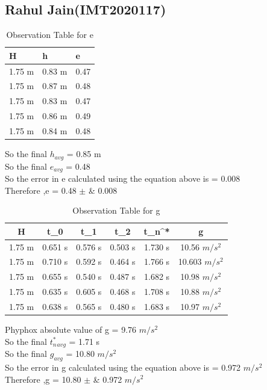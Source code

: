 \documentclass[11pt]{scrartcl} %
\begin{document}
\subsection{Rahul Jain(IMT2020117)}

\begin{table}[h] %
	\centering %
	\begin{tabular}{l l l}
		\toprule
		\textbf{H} & \textbf{h} & \textbf{e} \\
		\midrule
		1.75 m & 0.83 m & 0.47\\
        1.75 m & 0.87 m  & 0.48\\
        1.75 m & 0.83 m  & 0.47\\
        1.75 m & 0.86 m & 0.49 \\
        1.75 m & 0.84 m & 0.48 \\
		\bottomrule
	\end{tabular}
	\caption{Observation Table for e}
\end{table}
So the final $h_{avg}$ = 0.85 m\\
So the final $e_{avg}$ = 0.48\\
So the error in e calculated using the equation above is  = 0.008\\
Therefore ,e = 0.48  $\pm$ &  0.008 \\

\begin{table}[h]
\centering
\begin{tabular}{||c c c c c c||} 
\toprule
 \hline
 H & t_0 & t_1 & t_2 & t_n^* & g \\ [0.5ex] 
 \midrule
 \hline\hline
1.75 m & 0.651 s & 0.576 s  & 0.503 s & 1.730 s & 10.56 $m/s^2$  \\ 
 \hline
 1.75 m & 0.710 s & 0.592 s & 0.464 s & 1.766 s & 10.603 $m/s^2$  \\
 \hline
 1.75 m & 0.655 s & 0.540 s & 0.487 s & 1.682 s  & 10.98 $m/s^2$   \\
 \hline
 1.75 m & 0.635 s & 0.605 s & 0.468 s & 1.708 s  & 10.88 $m/s^2$   \\
 \hline
 1.75 m & 0.638 s & 0.565 s & 0.480 s & 1.683 s  & 10.97 $m/s^2$  \\ [1ex]
 \bottomrule
 \hline
\end{tabular}
\caption{Observation Table for g}
\end{table}
Phyphox absolute value of g = 9.76 $m/s^2$\\
So the final $t_n^*_{avg}$ = 1.71 s\\
So the final $g_{avg}$ = 10.80 $m/s^2$\\
So the error in g calculated using the equation above is  = 0.972 $m/s^2$ \\
Therefore ,g = 10.80  $\pm$ &  0.972 $m/s^2$ \\
\newpage
\end{document}
